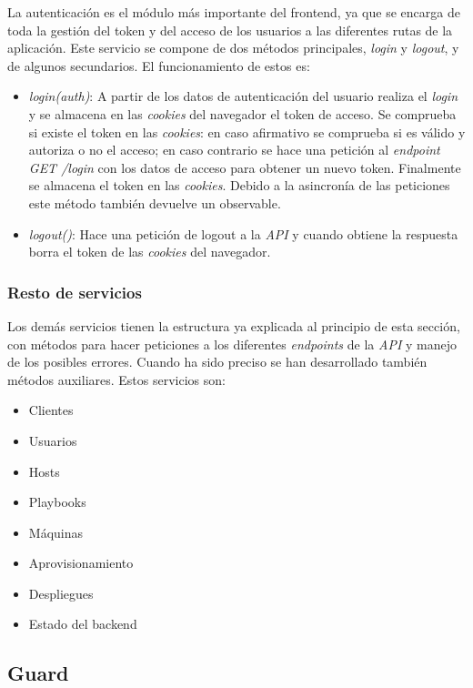 La autenticación es el módulo más importante del frontend, ya que se encarga de toda la gestión del token y del acceso de los usuarios a las diferentes rutas de la aplicación. Este servicio se compone de dos métodos principales, \textit{login} y \textit{logout}, y de algunos secundarios. El funcionamiento de estos es:
\begin{itemize}
	\item \textit{login(auth)}: A partir de los datos de autenticación del usuario realiza el \textit{login} y se almacena en las \textit{cookies} del navegador el token de acceso. Se comprueba si existe el token en las \textit{cookies}: en caso afirmativo se comprueba si es válido y autoriza o no el acceso; en caso contrario se hace una petición al \textit{endpoint} \textit{GET /login} con los datos de acceso para obtener un nuevo token. Finalmente se almacena el token en las \textit{cookies}. Debido a la asincronía de las peticiones este método también devuelve un observable.
	\item \textit{logout()}: Hace una petición de logout a la \textit{API} y cuando obtiene la respuesta borra el token de las \textit{cookies} del navegador.
\end{itemize}



\subsubsection{Resto de servicios}

Los demás servicios tienen la estructura ya explicada al principio de esta sección, con métodos para hacer peticiones a los diferentes \textit{endpoints} de la \textit{API} y manejo de los posibles errores. Cuando ha sido preciso se han desarrollado también métodos auxiliares. Estos servicios son:
\begin{itemize}
	\item Clientes
	\item Usuarios
	\item Hosts
	\item Playbooks
	\item Máquinas
	\item Aprovisionamiento
	\item Despliegues
	\item Estado del backend
\end{itemize}


\subsection{Guard}

